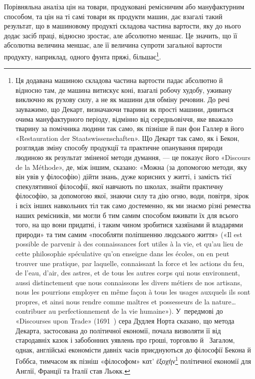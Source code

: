 Порівняльна аналіза цін на товари, продуковані ремісничим
або мануфактурним способом, та цін на ті самі товари як продукти
машин, дає взагалі такий результат, що в машиновому продукті
складова частина вартости, яку до нього додає засіб праці, відносно
зростає, але абсолютно меншає. Це значить, що її абсолютна
величина меншає, але її величина супроти загальної вартости
продукту, наприклад, одного фунта пряжі, більшає\footnote{
Ця додавана машиною складова частина вартости падає абсолютно
й відносно там, де машина витискує коні, взагалі робочу худобу,
уживану виключно як рухову силу, а не як машини для обміну речовин.
До речі зауважимо, що Декарт, визначаючи тварини як прості машини,
дивиться очима мануфактурного періоду, відмінно від середньовіччя,
яке вважало тварину за помічника людини так само, як пізніше й пан
фон Галлер в його «Restauration der Staatswissenschaften». Що Декарт
так само, як і Бекон, розглядав зміну способу продукції та практичне
опанування природи людиною як результат зміненої методи думання, —
це показує його «Discours de la Méthode», де, між іншим, сказано: «Можна
(за допомогою методи, яку він увів у філософію) дійти знань, дуже корисних
у житті, і замість тієї спекулятивної філософії, якої навчають по школах,
знайти практичну філософію, за допомогою якої, знаючи силу та дію
огню, води, повітря, зірок і всіх інших навкольних тіл так само достеменно,
як ми знаємо різні ремества наших ремісників, ми могли б тим
самим способом вживати їх для всього того, на що вони придатні, і таким
чином зробитися хазяїнами й владарями природи» та тим самим «пособляти
поліпшенню людського життя» («Il est possible de parvenir à des connaissances
fort utiles à la vie, et qu'au lieu de cette philosophie spéculative
qu’on enseigne dans les écoles, on en peut trouver une pratique, par laquelle,
connaissant la force et les actions du feu, de l’eau, d’air, des astres, et de
tous les autres corps qui nous environnent, aussi distinctement que nous
connaissons les divers métiers de nos artisans, nous les pourrions employer
en même façon à tous les usages auxquels ils sont propres, et ainsi nous
rendre comme maîtres et possesseurs de la nature\dots{} contribuer au
perfectionnement de la vie humaine»). У~передмові до «Discourses upon Trade»
(1691~) сера Дудлея Норта сказано, що метода Декарта, застосована
до політичної економії, почала визволяти її від стародавніх казок і забобонних
уявлень про гроші, торговлю й~ Загалом, однак, англійські
економісти давніх часів приєднуються до філософії Бекона й Гоббса, тимчасом
як пізніш «філософом» \textgreek{κατ’ ἐξοχήν}\footnote*{
переважно. 
} політичної економії для Англії,
Франції та Італії став Льокк.
}.

